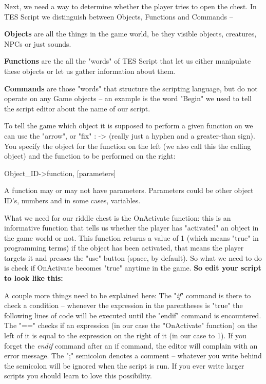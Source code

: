 Next, we need a way to determine whether the player tries to open the chest. In TES Script we distinguish between Objects, Functions and Commands --

\textbf{Objects} are all the things in the game world, be they visible objects, creatures, NPCs or just sounds.

\textbf{Functions} are the all the "words" of TES Script that let us either manipulate these objects or let us gather information about them.

\textbf{Commands} are those "words" that structure the scripting language, but do not operate on any Game objects -- an example is the word "Begin" we used to tell the script editor about the name of our script.

To tell the game which object it is supposed to perform a given function on we can use the "arrow", or "fix" : -\textgreater{} (really just a hyphen and a greater-than sign). You specify the object for the function on the left (we also call this the calling object) and the function to be performed on the right:

Object\_ID-\textgreater function, {[}parameters{]}

A function may or may not have parameters. Parameters could be other object ID's, numbers and in some cases, variables.

What we need for our riddle chest is the OnActivate function: this is an informative function that tells us whether the player has "activated" an object in the game world or not. This function returns a value of 1 (which means "true" in programming terms) if the object has been activated, that means the player targets it and presses the "use" button (space, by default). So what we need to do is check if OnActivate becomes "true" anytime in the game. \textbf{So edit your script to look like this:}



A couple more things need to be explained here: The "\emph{if}" command is there to check a condition -- whenever the expression in the parentheses is "true" the following lines of code will be executed until the "endif" command is encountered. The "==" checks if an expression (in our case the "OnActivate" function) on the left of it is equal to the expression on the right of it (in our case to 1). If you forget the \emph{endif} command after an if command, the editor will complain with an error message. The ";" semicolon denotes a comment -- whatever you write behind the semicolon will be ignored when the script is run. If you ever write larger scripts you should learn to love this possibility.

